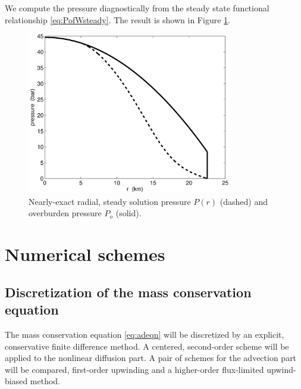 \documentclass[11pt,final]{amsart}%
\begin{document}
We compute the pressure diagnostically from the steady state functional relationship \eqref{eq:PofWsteady}.  The result is shown in Figure \ref{fig:Pexact}.

\begin{figure}[ht]
\includegraphics[width=3.5in,keepaspectratio=true]{figs/exact-P-plot}
\caption{Nearly-exact radial, steady solution pressure $P(r)$ (dashed) and overburden pressure $P_o$ (solid).}
\label{fig:Pexact}
\end{figure}


\section{Numerical schemes}  \label{sec:num}

\subsection*{Discretization of the mass conservation equation}  The mass conservation equation \eqref{eq:adeqn} will be discretized by an explicit, conservative finite difference method.   A centered, second-order scheme will be applied to the nonlinear diffusion part.  A pair of schemes for the advection part will be compared, first-order upwinding and a higher-order flux-limited upwind-biased method.
\end{document}
